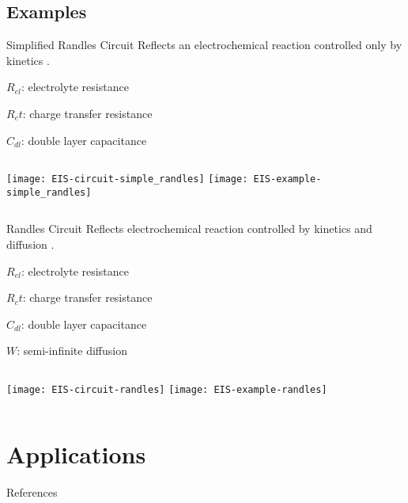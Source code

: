 \documentclass[10pt,compress,handout]{beamer}
\begin{document}
    \subsection{Examples}
    \begin{frame}{Simplified Randles Circuit}
        Reflects an electrochemical reaction controlled only by kinetics \citep{lazanas2023}.

        $R_{el}$: electrolyte resistance

        $R_ct$: charge transfer resistance

        $C_{dl}$: double layer capacitance

        \begin{columns}
                \texttt{[image: EIS-circuit-simple\_randles]}
                \texttt{[image: EIS-example-simple\_randles]}
        \end{columns}
    \end{frame}

    \begin{frame}{Randles Circuit}
        Reflects electrochemical reaction controlled by kinetics and diffusion \citep{lazanas2023}.

        $R_{el}$: electrolyte resistance

        $R_ct$: charge transfer resistance

        $C_{dl}$: double layer capacitance

        $W$: semi-infinite diffusion
        \begin{columns}
                \texttt{[image: EIS-circuit-randles]}
                \texttt{[image: EIS-example-randles]}
        \end{columns}
        
    \end{frame}

\section{Applications}

\begin{frame}[allowframebreaks=0.9]{References}
\AtNextBibliography{\tiny}
\printbibliography
\end{frame}
\end{document}
